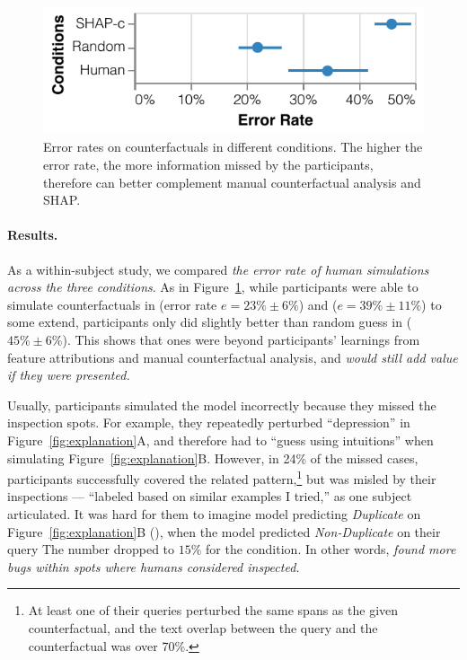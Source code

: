 \begin{figure}[t]
\centering
\includegraphics[width=1\columnwidth]{figures/err_rate.pdf}
\vspace{-15pt}
\caption{
Error rates on counterfactuals in different conditions. The higher the error rate, the more information missed by the participants, therefore can better complement manual counterfactual analysis and SHAP.
}
\vspace{-10pt}
\label{fig:err_rate}
\end{figure}

\paragraph{Results.}
As a within-subject study, we compared \emph{the error rate of human simulations across the three conditions}.
As in Figure~\ref{fig:err_rate}, while participants were able to simulate counterfactuals in \crandom (error rate $e=23\%\pm6\%$) and \chuman ($e=39\%\pm11\%$) to some extend, participants only did slightly better than random guess in \cshap ($45\%\pm 6\%$).
This shows that \cshap ones were beyond participants' learnings from feature attributions and manual counterfactual analysis, and \emph{would still add value if they were presented.}

Usually, participants simulated the model incorrectly because they missed the inspection spots.
For example, they repeatedly perturbed ``depression'' in Figure~\ref{fig:explanation}A, and therefore had to ``guess using intuitions'' when simulating Figure~\ref{fig:explanation}B.
However, in 24\% of the missed \cshap cases, participants successfully covered the related pattern,\footnote{At least one of their queries perturbed the same spans as the given counterfactual, and the text overlap between the query and the counterfactual was over 70\%.} but was misled by their inspections --- ``labeled based on similar examples I tried,'' as one subject articulated.
It was hard for them to imagine model predicting \emph{Duplicate} on Figure~\ref{fig:explanation}B (), when the model predicted \emph{Non-Duplicate} on their query 
The number dropped to $15\%$ for the \chuman condition.
In other words, \emph{\cshap found more bugs within spots where humans considered inspected.}


